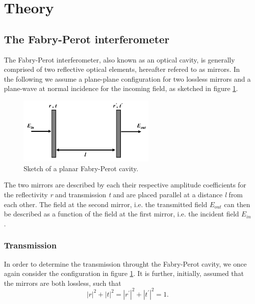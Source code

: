 \section{Theory}
\subsection{The Fabry-Perot interferometer}\label{sec:fabry_perot}

The Fabry-Perot interferometer, also known as an optical cavity, is generally comprised of two reflective optical elements, hereafter refered to as mirrors. In the following we assume a plane-plane configuration for two lossless mirrors and a plane-wave at normal incidence for the incoming field, as sketched in figure \ref{fig:planar_fabry-perot}. 

\begin{figure}[h!]
    \centering
    \includegraphics[width=0.6\textwidth]{figures/planar_fabry_perot.pdf}
    \caption{Sketch of a planar Fabry-Perot cavity.}
    \label{fig:planar_fabry-perot}
\end{figure}

The two mirrors are described by each their respective amplitude coefficients for the reflectivity \emph{r} and transmission \emph{t} and are placed parallel at a distance \emph{l} from each other. The field at the second mirror, i.e. the transmitted field $E_{out}$ can then be described as a function of the field at the first mirror, i.e. the incident field $E_{in}$\cite{Eichhorn,Pedrotti}. 

\subsubsection{Transmission}

In order to determine the transmission throught the Fabry-Perot cavity, we once again consider the configuration in figure \ref{fig:planar_fabry-perot}. It is further, initially, assumed that the mirrors are both lossless, such that
\begin{equation}
    |r|^2 + |t|^2 = |r^{\prime}|^2 + |t^{\prime}|^2 = 1.
    \label{eq:lossless_condition}
\end{equation}

